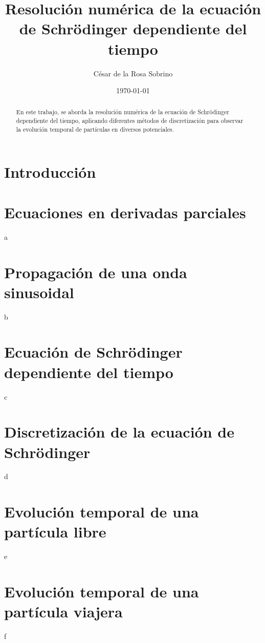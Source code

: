 \documentclass[twocolumn, aps, prd, 10pt, superscriptaddress, nofootinbib]{revtex4-2}
\date{\today}
\makeatletter
\renewcommand{\date}[1]{\gdef\@date{\textnormal{Fecha: #1}}}
\makeatother
\begin{document}
\title{Resolución numérica de la ecuación de Schrödinger dependiente del tiempo}
\author{César de la Rosa Sobrino}
\date{\today}

\begin{abstract}
En este trabajo, se aborda la resolución numérica de la ecuación de Schrödinger dependiente del tiempo, aplicando diferentes métodos de discretización para observar la evolución temporal de partículas en diversos potenciales.
\end{abstract}

\maketitle

\section{Introducción}


\section{Ecuaciones en derivadas parciales}

a
\section{Propagación de una onda sinusoidal}

b
\section{Ecuación de Schrödinger dependiente del tiempo}

c
\section{Discretización de la ecuación de Schrödinger}

d
\section{Evolución temporal de una partícula libre}

e
\section{Evolución temporal de una partícula viajera}

f
\end{document}
